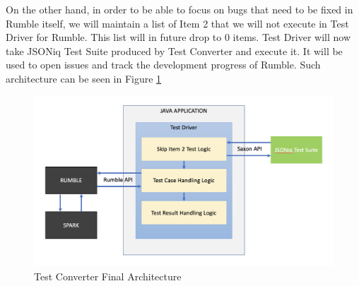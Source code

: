 On the other hand, in order to be able to focus on bugs that need to be fixed in Rumble itself, we will maintain a list of Item 2 that we will not execute in Test Driver for Rumble. This list will in future drop to 0 items. Test Driver will now take JSONiq Test Suite produced by Test Converter and execute it. It will be used to open issues and track the development progress of Rumble. Such architecture can be seen in Figure \ref{fig:test_driver_final_architecture.png}

\begin{figure}[h!]
	\includegraphics[width=\linewidth]{test_driver_final_architecture.png}
	\vspace*{-5mm}
	\caption{Test Converter Final Architecture}
	\label{fig:test_driver_final_architecture.png}
\end{figure}
